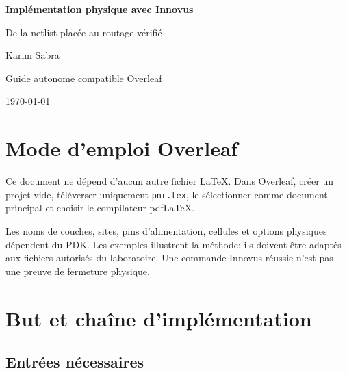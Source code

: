 \documentclass[11pt,a4paper,openany]{report}
\begin{document}
\begin{titlepage}
  \centering
  \vspace*{28mm}
  {\Huge\bfseries\color{GuideBlue}Implémentation physique avec Innovus\par}
  \vspace{7mm}
  {\LARGE De la netlist placée au routage vérifié\par}
  \vfill
  {\Large Karim Sabra\par}
  \vspace{4mm}
  {Guide autonome compatible Overleaf\par}
  {\today\par}
\end{titlepage}

\chapter*{Mode d'emploi Overleaf}

Ce document ne dépend d'aucun autre fichier LaTeX. Dans Overleaf, créer un
projet vide, téléverser uniquement \texttt{pnr.tex}, le sélectionner comme
document principal et choisir le compilateur pdfLaTeX.

\begin{warningbox}[Portée]
Les noms de couches, sites, pins d'alimentation, cellules et options physiques
dépendent du PDK. Les exemples illustrent la méthode; ils doivent être adaptés
aux fichiers autorisés du laboratoire. Une commande Innovus réussie n'est pas
une preuve de fermeture physique.
\end{warningbox}

\tableofcontents

\chapter{But et chaîne d'implémentation}

\section{Entrées nécessaires}
\end{document}
